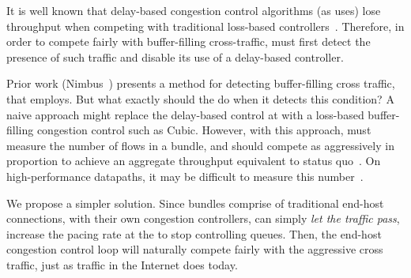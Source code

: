 
It is well known that delay-based congestion control algorithms (as \name uses) lose throughput when competing with traditional loss-based controllers~\cite{copa}. Therefore, in order to compete fairly with buffer-filling cross-traffic, \name must first detect the presence of such traffic and disable its use of a delay-based controller.  

Prior work (Nimbus~\cite{nimbus-arxiv}) presents a method for detecting buffer-filling cross traffic, that \name employs. 
But what exactly should the \inbox do when it detects this condition?
A naive approach might replace the delay-based control at \name with a loss-based buffer-filling congestion control such as Cubic. 
However, with this approach, \name must measure the number of flows in a bundle, and should compete as aggressively in proportion to achieve an aggregate throughput equivalent to status quo~\cite{multcp}. On high-performance datapaths, it may be difficult to measure this number~\cite{heavy-hitters}.

We propose a simpler solution.
Since bundles comprise of traditional end-host connections, with their own congestion controllers, \name can simply \emph{let the traffic pass}, \ie increase the pacing rate at the \inbox to stop controlling queues. Then, the end-host congestion control loop will naturally compete fairly with the aggressive cross traffic, just as traffic in the Internet does today.

